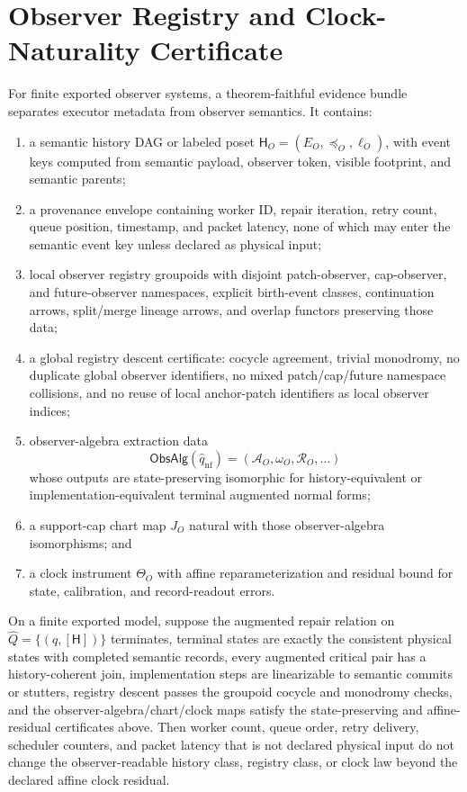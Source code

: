 \section{Observer Registry and Clock-Naturality Certificate}
\label{app:observer-registry-clock-contract}

For finite exported observer systems, a theorem-faithful evidence bundle separates executor
metadata from observer semantics. It contains:
\begin{enumerate}[label=(\roman*),leftmargin=2em]
\item a semantic history DAG or labeled poset \(\mathsf H_O=(E_O,\preceq_O,\ell_O)\), with event
keys computed from semantic payload, observer token, visible footprint, and semantic parents;
\item a provenance envelope containing worker ID, repair iteration, retry count, queue position,
timestamp, and packet latency, none of which may enter the semantic event key unless declared as
physical input;
\item local observer registry groupoids with disjoint patch-observer, cap-observer, and
future-observer namespaces, explicit birth-event classes, continuation arrows, split/merge lineage
arrows, and overlap functors preserving those data;
\item a global registry descent certificate: cocycle agreement, trivial monodromy, no duplicate
global observer identifiers, no mixed patch/cap/future namespace collisions, and no reuse of local
anchor-patch identifiers as local observer indices;
\item observer-algebra extraction data
\[
\mathsf{ObsAlg}(\widehat q_{\mathrm{nf}})
=
(\mathcal A_O,\omega_O,\mathcal R_O,\ldots)
\]
whose outputs are state-preserving isomorphic for history-equivalent or implementation-equivalent
terminal augmented normal forms;
\item a support-cap chart map \(J_O\) natural with those observer-algebra isomorphisms; and
\item a clock instrument \(\Theta_O\) with affine reparameterization and residual bound for state,
calibration, and record-readout errors.
\end{enumerate}

\begin{theorem}\label{thm:finite-observer-clock-certificate}
On a finite exported model, suppose the augmented repair relation on
\(\widehat Q=\{(q,[\mathsf H])\}\) terminates, terminal states are exactly the consistent physical
states with completed semantic records, every augmented critical pair has a history-coherent join,
implementation steps are linearizable to semantic commits or stutters, registry descent passes the
groupoid cocycle and monodromy checks, and the observer-algebra/chart/clock maps satisfy the
state-preserving and affine-residual certificates above. Then worker count, queue order, retry
delivery, scheduler counters, and packet latency that is not declared physical input do not change
the observer-readable history class, registry class, or clock law beyond the declared affine clock
residual.
\end{theorem}

